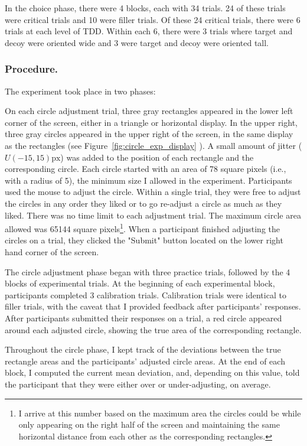 In the choice phase, there were 4 blocks, each with 34 trials. 24 of these trials were critical trials and 10 were filler trials. Of these 24 critical trials, there were 6 trials at each level of TDD. Within each 6, there were 3 trials where target and decoy were oriented wide and 3 were target and decoy were oriented tall. 

\subsubsection{Procedure.}

The experiment took place in two phases: 

On each circle adjustment trial, three gray rectangles appeared in the lower left corner of the screen, either in a triangle or horizontal display. In the upper right, three gray circles appeared in the upper right of the screen, in the same display as the rectangles (see Figure~\ref{fig:circle_exp_display} ). A small amount of jitter ($U(-15,15)\text{px}$) was added to the position of each rectangle and the corresponding circle. Each circle started with an area of 78 square pixels (i.e., with a radius of 5), the minimum size I allowed in the experiment. Participants used the mouse to adjust the circle. Within a single trial, they were free to adjust the circles in any order they liked or to go re-adjust a circle as much as they liked. There was no time limit to each adjustment trial. The maximum circle area allowed was 65144 square pixels\footnote{I arrive at this number based on the maximum area the circles could be while only appearing on the right half of the screen and maintaining the same horizontal distance from each other as the corresponding rectangles.}. When a participant finished adjusting the circles on a trial, they clicked the "Submit" button located on the lower right hand corner of the screen. 

The circle adjustment phase began with three practice trials, followed by the 4 blocks of experimental trials. At the beginning of each experimental block, participants completed 3 calibration trials. Calibration trials were identical to filler trials, with the caveat that I provided feedback after participants' responses. After participants submitted their responses on a trial, a red circle appeared around each adjusted circle, showing the true area of the corresponding rectangle. 

Throughout the circle phase, I kept track of the deviations between the true rectangle areas and the participants' adjusted circle areas. At the end of each block, I computed the current mean deviation, and, depending on this value, told the participant that they were either over or under-adjusting, on average.

